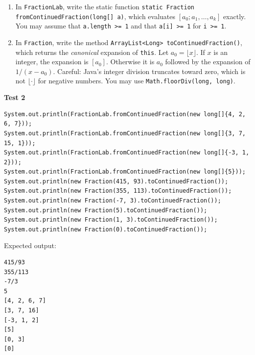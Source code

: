\documentclass[11pt,a4paper]{article}
\newcommand{\code}[1]{\lstinline[basicstyle=\ttfamily\normalsize,basewidth=0.5em]{#1}}
\newcommand{\spec}[1]{\par\smallskip\textbf{#1}\par}
\begin{document}
\begin{enumerate}[label=(\alph*)]
  \item In \code{FractionLab}, write the static function
        \code{static Fraction fromContinuedFraction(long[] a)}, which evaluates
        $[a_0; a_1, \dots, a_k]$ exactly. You may assume that \code{a.length >= 1}
        and that \code{a[i] >= 1} for \code{i >= 1}.
  \item In \code{Fraction}, write the method
        \code{ArrayList<Long> toContinuedFraction()}, which returns the
        \emph{canonical} expansion of \code{this}. Let $a_0 = \lfloor x \rfloor$. If
        $x$ is an integer, the expansion is $[a_0]$. Otherwise it is $a_0$
        followed by the expansion of $1/(x - a_0)$. Careful: Java's integer
        division truncates toward zero, which is not $\lfloor\cdot\rfloor$ for negative
        numbers. You may use \code{Math.floorDiv(long, long)}.
\end{enumerate}

\spec{Test 2}
\begin{lstlisting}
System.out.println(FractionLab.fromContinuedFraction(new long[]{4, 2, 6, 7}));
System.out.println(FractionLab.fromContinuedFraction(new long[]{3, 7, 15, 1}));
System.out.println(FractionLab.fromContinuedFraction(new long[]{-3, 1, 2}));
System.out.println(FractionLab.fromContinuedFraction(new long[]{5}));
System.out.println(new Fraction(415, 93).toContinuedFraction());
System.out.println(new Fraction(355, 113).toContinuedFraction());
System.out.println(new Fraction(-7, 3).toContinuedFraction());
System.out.println(new Fraction(5).toContinuedFraction());
System.out.println(new Fraction(1, 3).toContinuedFraction());
System.out.println(new Fraction(0).toContinuedFraction());
\end{lstlisting}
\begin{minipage}[t]{0.45\textwidth}
Expected output:
\begin{lstlisting}[style=out]
415/93
355/113
-7/3
5
[4, 2, 6, 7]
[3, 7, 16]
[-3, 1, 2]
[5]
[0, 3]
[0]
\end{lstlisting}
\end{minipage}
\end{document}
